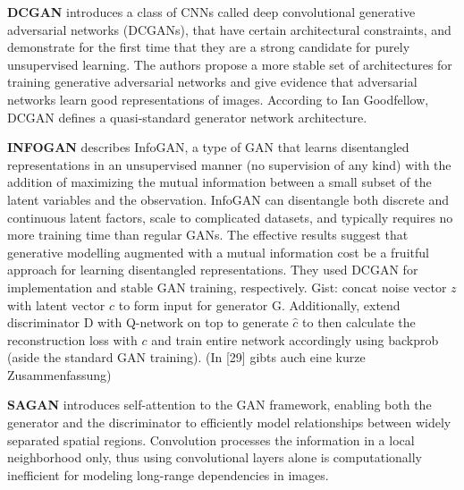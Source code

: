 \documentclass[12pt,a4paper]{article}
\begin{document}
\par \textbf{DCGAN} \cite{1511.06434} introduces a class of CNNs called deep convolutional generative adversarial networks (DCGANs), that have certain architectural constraints, and demonstrate for the first time that they are a strong candidate for purely unsupervised learning. The authors propose a more stable set of architectures for training generative adversarial networks and give evidence that adversarial networks learn good representations of images. According to Ian Goodfellow, DCGAN defines a quasi-standard generator network architecture. 

\par\textbf{INFOGAN} \cite{1606.03657} describes InfoGAN, a type of GAN that learns disentangled representations in an unsupervised manner (no supervision of any kind) with the addition of maximizing the mutual information between a small subset of the latent variables and the observation. InfoGAN can disentangle both discrete and continuous latent factors, scale to complicated datasets, and typically requires no more training time than regular GANs.  The effective results suggest that generative modelling augmented with a mutual information cost be a fruitful approach for learning disentangled representations. They used DCGAN for implementation and stable GAN training, respectively. Gist: concat noise vector $z$ with latent vector $c$ to form input for generator G. Additionally, extend discriminator D with Q-network on top to generate $\hat{c}$ to then calculate the reconstruction loss with $c$ and train entire network accordingly using backprob (aside the standard GAN training). (In [29] gibts auch eine kurze Zusammenfassung)

\par \textbf{SAGAN} \cite{1805.08318} introduces self-attention to the GAN framework, enabling both the generator and the discriminator to efficiently model relationships between widely separated spatial regions. Convolution processes the information in a local neighborhood only, thus using convolutional layers alone is computationally inefficient for modeling long-range dependencies in images.
\end{document}
